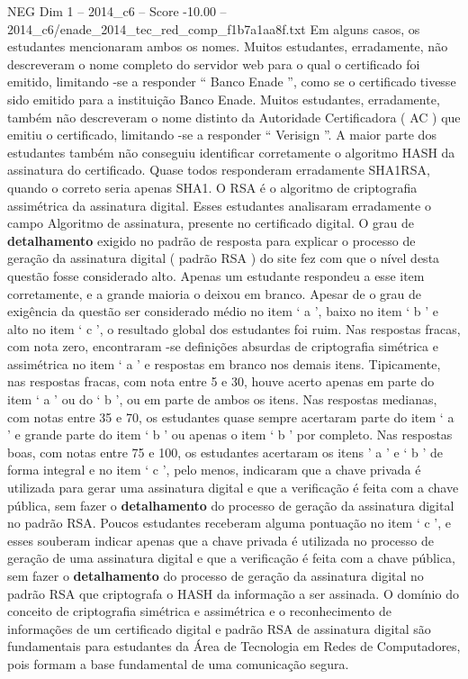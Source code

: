 \begin{textsample}{NEG Dim 1 – 2014\_c6 – Score -10.00 – 2014\_c6/enade\_2014\_tec\_red\_comp\_f1b7a1aa8f.txt}
Em alguns casos, os estudantes mencionaram ambos os nomes.
Muitos estudantes, erradamente, não descreveram o nome completo do servidor web para o qual o certificado foi emitido, limitando -se a responder “ Banco Enade ”, como se o certificado tivesse sido emitido para a instituição Banco Enade.
Muitos estudantes, erradamente, também não descreveram o nome distinto da Autoridade Certificadora ( AC ) que emitiu o certificado, limitando -se a responder “ Verisign ”.
A maior parte dos estudantes também não conseguiu identificar corretamente o algoritmo HASH da assinatura do certificado.
Quase todos responderam erradamente SHA1RSA, quando o correto seria apenas SHA1.
O RSA é o algoritmo de criptografia assimétrica da assinatura digital.
Esses estudantes analisaram erradamente o campo Algoritmo de assinatura, presente no certificado digital.
O grau de \textbf{detalhamento} exigido no padrão de resposta para explicar o processo de geração da assinatura digital ( padrão RSA ) do site fez com que o nível desta questão fosse considerado alto.
Apenas um estudante respondeu a esse item corretamente, e a grande maioria o deixou em branco.
Apesar de o grau de exigência da questão ser considerado médio no item ‘ a ’, baixo no item ‘ b ’ e alto no item ‘ c ’, o resultado global dos estudantes foi ruim.
Nas respostas fracas, com nota zero, encontraram -se definições absurdas de criptografia simétrica e assimétrica no item ‘ a ’ e respostas em branco nos demais itens.
Tipicamente, nas respostas fracas, com nota entre 5 e 30, houve acerto apenas em parte do item ‘ a ’ ou do ‘ b ’, ou em parte de ambos os itens.
Nas respostas medianas, com notas entre 35 e 70, os estudantes quase sempre acertaram parte do item ‘ a ’ e grande parte do item ‘ b ’ ou apenas o item ‘ b ’ por completo.
Nas respostas boas, com notas entre 75 e 100, os estudantes acertaram os itens ’ a ’ e ‘ b ’ de forma integral e no item ‘ c ’, pelo menos, indicaram que a chave privada é utilizada para gerar uma assinatura digital e que a verificação é feita com a chave pública, sem fazer o \textbf{detalhamento} do processo de geração da assinatura digital no padrão RSA.
Poucos estudantes receberam alguma pontuação no item ‘ c ’, e esses souberam indicar apenas que a chave privada é utilizada no processo de geração de uma assinatura digital e que a verificação é feita com a chave pública, sem fazer o \textbf{detalhamento} do processo de geração da assinatura digital no padrão RSA que criptografa o HASH da informação a ser assinada.
O domínio do conceito de criptografia simétrica e assimétrica e o reconhecimento de informações de um certificado digital e padrão RSA de assinatura digital são fundamentais para estudantes da Área de Tecnologia em Redes de Computadores, pois formam a base fundamental de uma comunicação segura.

\end{textsample}

